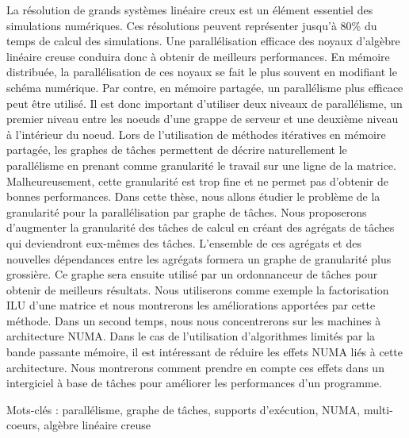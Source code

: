 La résolution de grands systèmes linéaire creux est un élément essentiel des simulations numériques. Ces résolutions peuvent représenter jusqu'à 80\% du temps de calcul des simulations.
Une parallélisation efficace des noyaux d'algèbre linéaire creuse conduira donc à obtenir de meilleurs performances. En mémoire distribuée, la parallélisation de ces noyaux se fait le plus souvent en modifiant le schéma numérique. Par contre, en mémoire partagée, un parallélisme plus efficace peut être utilisé. Il est donc important d'utiliser deux niveaux de parallélisme, un premier niveau entre les noeuds d'une grappe de serveur et une deuxième niveau à l'intérieur du noeud. Lors de l'utilisation de méthodes itératives en mémoire partagée, les graphes de tâches permettent de décrire naturellement le parallélisme en prenant comme granularité le travail sur une ligne de la matrice. Malheureusement, cette granularité est trop fine et ne permet pas d'obtenir de bonnes performances.
Dans cette thèse, nous allons étudier le problème de la granularité pour la parallélisation par graphe de tâches. Nous proposerons d'augmenter la granularité des tâches de calcul en créant des agrégats de tâches qui deviendront eux-mêmes des tâches. L'ensemble de ces agrégats et des nouvelles dépendances entre les agrégats formera un graphe de granularité plus grossière. Ce graphe sera ensuite utilisé par un ordonnanceur de tâches pour obtenir de meilleurs résultats. Nous utiliserons comme exemple la factorisation ILU d'une matrice et nous montrerons les améliorations apportées par cette méthode. Dans un second temps, nous nous concentrerons sur les machines à architecture NUMA. Dans le cas de l'utilisation d'algorithmes limités par la bande passante mémoire, il est intéressant de réduire les effets NUMA liés à cette architecture. Nous montrerons comment prendre en compte ces effets dans un intergiciel à base de tâches pour améliorer les performances d'un programme.

Mots-clés : parallélisme, graphe de tâches, supports d’exécution, NUMA, multi-coeurs, algèbre linéaire creuse

